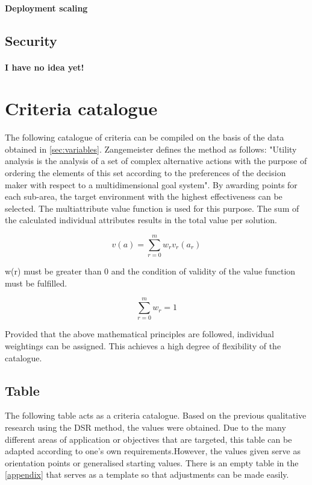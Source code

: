 \documentclass[MSC,Master,english]{twbook}%
\begin{document}
\paragraph{Deployment scaling}

\subsection{Security}
\paragraph{I have no idea yet!}

\section{Criteria catalogue}
\label{sec:cc}
The following catalogue of criteria can be compiled on the basis of the data obtained in \autoref{sec:variables}. Zangemeister defines the method as follows: "Utility analysis is the analysis of a set of complex alternative actions with the purpose of ordering the elements of this set according to the preferences of the decision maker with respect to a multidimensional goal system"\cite{nwa}. By awarding points for each sub-area, the target environment with the highest effectiveness can be selected. The multiattribute value function is used for this purpose. The sum of the calculated individual attributes results in the total value per solution.

\begin{equation*}
v(a) = \sum \limits_{r=0}^{m}w_{r} v_{r} (a_{r})
\end{equation*}

w(r) must be greater than 0 and the condition of validity of the value function must be fulfilled.

\begin{equation*}
\sum \limits_{r=0}^{m} w_{r} = 1
\end{equation*}

Provided that the above mathematical principles are followed, individual weightings can be assigned. This achieves a high degree of flexibility of the catalogue. 

\subsection{Table}
The following table acts as a criteria catalogue. Based on the previous qualitative research using the \ac{DSR} method, the values were obtained. Due to the many different areas of application or objectives that are targeted, this table can be adapted according to one's own requirements.However, the values given serve as orientation points or generalised starting values. There is an empty table in the \autoref{appendix} that serves as a template so that adjustments can be made easily.
\end{document}

